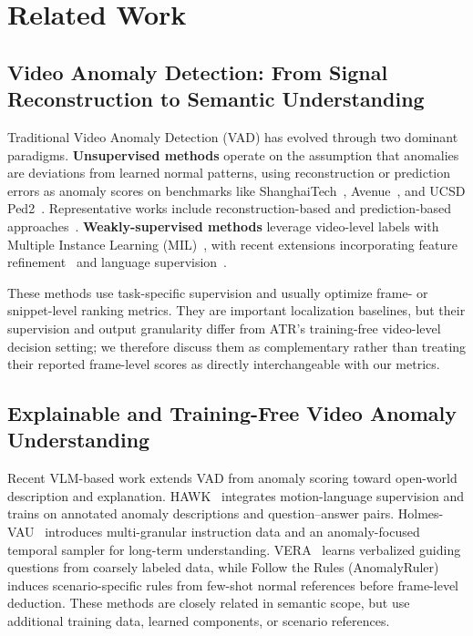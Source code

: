 \section{Related Work}

\subsection{Video Anomaly Detection: From Signal Reconstruction to Semantic Understanding}

Traditional Video Anomaly Detection (VAD) has evolved through two dominant paradigms.
\textbf{Unsupervised methods} operate on the assumption that anomalies are deviations from learned normal patterns, using reconstruction or prediction errors as anomaly scores on benchmarks like ShanghaiTech~\cite{luo2017revisit}, Avenue~\cite{lu2013abnormal}, and UCSD Ped2~\cite{li2013anomaly}. Representative works include reconstruction-based and prediction-based approaches~\cite{gong2019memorizing,park2020learning,liu2018future}.
\textbf{Weakly-supervised methods} leverage video-level labels with Multiple Instance Learning (MIL)~\cite{sultani2018real,tian2021weakly,lv2023unbiased,zhang2024mtfl}, with recent extensions incorporating feature refinement~\cite{feng2021mist,wan2021weakly,wu2022self} and language supervision~\cite{wu2024vadclip,gu2024anomalygpt,wu2024open}.

These methods use task-specific supervision and usually optimize frame- or snippet-level ranking metrics. They are important localization baselines, but their supervision and output granularity differ from ATR's training-free video-level decision setting; we therefore discuss them as complementary rather than treating their reported frame-level scores as directly interchangeable with our metrics.

\subsection{Explainable and Training-Free Video Anomaly Understanding}

Recent VLM-based work extends VAD from anomaly scoring toward open-world description and explanation. HAWK~\cite{tang2024hawk} integrates motion-language supervision and trains on annotated anomaly descriptions and question--answer pairs. Holmes-VAU~\cite{zhang2024holmes} introduces multi-granular instruction data and an anomaly-focused temporal sampler for long-term understanding. VERA~\cite{ye2025vera} learns verbalized guiding questions from coarsely labeled data, while Follow the Rules (AnomalyRuler)~\cite{yang2024follow} induces scenario-specific rules from few-shot normal references before frame-level deduction. These methods are closely related in semantic scope, but use additional training data, learned components, or scenario references.

